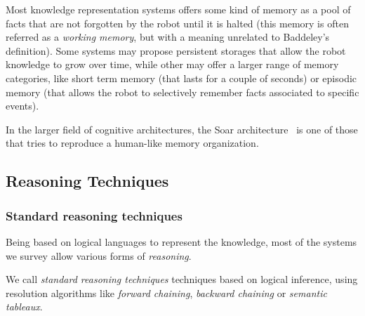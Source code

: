 Most knowledge representation systems offers some kind of memory as a pool of
facts that are not forgotten by the robot until it is halted (this memory is
often referred as a \emph{working memory}, but with a meaning unrelated to
Baddeley's definition). Some systems may propose persistent storages that allow
the robot knowledge to grow over time, while other may offer a larger range of
memory categories, like short term memory (that lasts for a couple of seconds)
or episodic memory (that allows the robot to selectively remember facts
associated to specific events).

In the larger field of cognitive architectures, the {\sc Soar}
architecture~\cite{Lehman2006} is one of those that tries to reproduce a
human-like memory organization.

\subsection{Reasoning Techniques}
\label{sect|reasoning}

\begin{scriptsize}
\begin{center}
\end{center}
\end{scriptsize}


\subsubsection{Standard reasoning techniques}

Being based on logical languages to represent the knowledge, most of the
systems we survey allow various forms of \emph{reasoning}.

We call \emph{standard reasoning techniques} techniques based on logical
inference, using resolution algorithms like \emph{forward chaining},
\emph{backward chaining} or \emph{semantic tableaux}.

